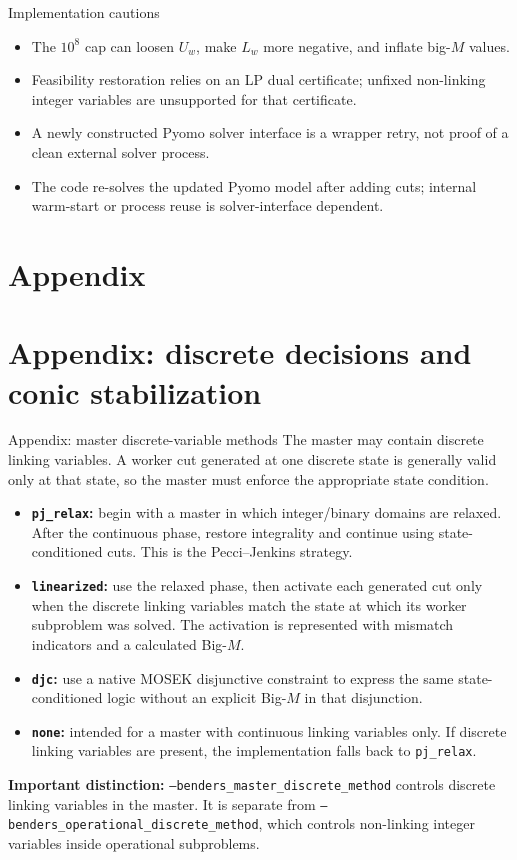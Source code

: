 \documentclass[aspectratio=169,10pt]{beamer}
\begin{document}
\begin{frame}{Implementation cautions}
\begin{itemize}
\setlength{\itemsep}{8pt}
\item The $10^8$ cap can loosen $U_w$, make $L_w$ more negative, and inflate big-$M$ values.
\item Feasibility restoration relies on an LP dual certificate; unfixed non-linking integer variables are unsupported for that certificate.
\item A newly constructed Pyomo solver interface is a wrapper retry, not proof of a clean external solver process.
\item The code re-solves the updated Pyomo model after adding cuts; internal warm-start or process reuse is solver-interface dependent.
\end{itemize}
\end{frame}

\section{Appendix}

\appendix
\section{Appendix: discrete decisions and conic stabilization}

\begin{frame}{Appendix: master discrete-variable methods}
\small
The master may contain discrete linking variables. A worker cut generated at one discrete state is generally valid only at that state, so the master must enforce the appropriate state condition.

\begin{itemize}
\item \textbf{\texttt{pj\_relax}:} begin with a master in which integer/binary domains are relaxed. After the continuous phase, restore integrality and continue using state-conditioned cuts. This is the Pecci--Jenkins strategy.
\item \textbf{\texttt{linearized}:} use the relaxed phase, then activate each generated cut only when the discrete linking variables match the state at which its worker subproblem was solved. The activation is represented with mismatch indicators and a calculated Big-$M$.
\item \textbf{\texttt{djc}:} use a native MOSEK disjunctive constraint to express the same state-conditioned logic without an explicit Big-$M$ in that disjunction.
\item \textbf{\texttt{none}:} intended for a master with continuous linking variables only. If discrete linking variables are present, the implementation falls back to \texttt{pj\_relax}.
\end{itemize}
\vspace{1mm}
\textbf{Important distinction:} \texttt{--benders\_master\_discrete\_method} controls discrete linking variables in the master. It is separate from \texttt{--benders\_operational\_discrete\_method}, which controls non-linking integer variables inside operational subproblems.
\end{frame}
\end{document}
